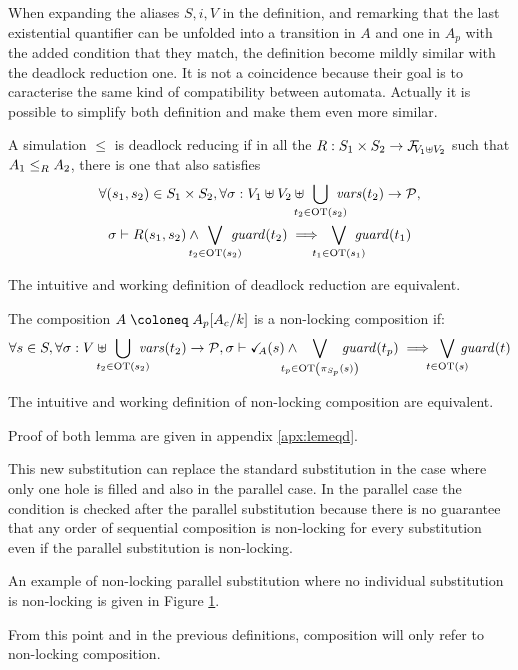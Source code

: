 \documentclass{article}
\begin{document}
When expanding the aliases \(S, i, V\) in the definition, and remarking that the last existential quantifier can be unfolded into a transition in \(A\) and one in \(A_p\) with the added condition that they match, the definition become mildly similar with the deadlock reduction one.
It is not a coincidence because their goal is to caracterise the same kind of compatibility between automata.
Actually it is possible to simplify both definition and make them even more similar.

\begin{defi}[Deadlock reduction, working definition] %
A simulation \(\leq\) is deadlock reducing if in all the \(R: S_1 \times S_2 \to \rformulae[V_1 \uplus V_2]\) such that \(\wrel{A_1}{A_2}{R}\), there is one that also satisfies
\begin{multline*}
	\forall \mpar{s_1, s_2} \in S_1 \times S_2, \forall \sigma: V_1 \uplus V_2 \uplus \bigcup_\subbox{t_2 \in \fOT{s_2}} \fvars{t_2} \to \values, \\
	\sigma \vdash R\mpar{s_1, s_2} \wedge \bigvee_\subbox{t_2 \in \fOT{s_2}} \fguard{t_2} \implies \bigvee_\subbox{t_1 \in \fOT{s_1}} \fguard{t_1}
\end{multline*}
\end{defi}
\begin{lem}
The intuitive and working definition of deadlock reduction are equivalent.
\end{lem}

\begin{defi}
The composition \(A \defobject A_p\subst{A_c}{k}\) is a non-locking composition if:
\[ \forall s \in S, \forall \sigma: V \uplus \bigcup_\subbox{t_2 \in \fOT{s_2}} \fvars{t_2} \to \values, \sigma \vdash \reach{A}\mpar{s} \wedge \bigvee_\subbox{t_p \in \fOT{\pi_{S_p}\mpar{s}}} \fguard{t_p} \implies \bigvee_\subbox{t \in \fOT{s}} \fguard{t} \]
\end{defi}
\begin{lem}
The intuitive and working definition of non-locking composition are equivalent.
\end{lem}
Proof of both lemma are given in appendix \ref{apx:lemeqd}.


This new substitution can replace the standard substitution in the case where only one hole is filled and also in the parallel case.
In the parallel case the condition is checked after the parallel substitution because there is no guarantee that any order of sequential composition is non-locking for every substitution even if the parallel substitution is non-locking.
\begin{exi} %
\begin{figure}
\centering

\vrule

\vrule

\caption{}
\label{fig:pnls}
\end{figure}
An example of non-locking parallel substitution where no individual substitution is non-locking is given in Figure \ref{fig:pnls}.%
\end{exi}
From this point and in the previous definitions, composition will only refer to non-locking composition.
\end{document}
